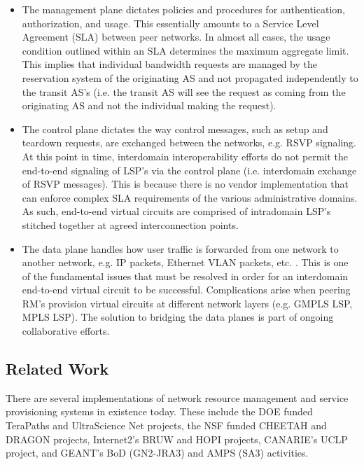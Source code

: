\documentclass[conference]{IEEEtran}
\begin{document}
\begin{itemize}
\item
The management plane dictates policies and procedures for authentication, 
authorization, and usage.  This essentially amounts to a Service Level 
Agreement (SLA) between peer networks.  In almost all cases, the 
usage 
condition outlined within an SLA determines the maximum aggregate limit.  
This implies that individual bandwidth requests are managed by the reservation 
system of the originating AS and not propagated independently to the transit 
AS's 
(i.e. the transit AS will see the request as coming from the originating AS and not the individual making the request).

\item
The control plane dictates the way control messages, such as setup and 
teardown requests, are exchanged between the networks, e.g. RSVP signaling.
At this point in time, interdomain interoperability efforts do not permit
the end-to-end signaling of LSP's via the control plane (i.e. interdomain 
exchange of RSVP messages).  This is because
there is no vendor implementation that can enforce complex SLA requirements of 
the various administrative domains.  As such, end-to-end virtual circuits are
comprised
of intradomain LSP's stitched together at agreed interconnection points.

\item
The data plane handles how user traffic is forwarded from one network to 
another network, e.g. IP packets, Ethernet VLAN packets, etc. \cite{vlan-ext}.
This is one of 
the fundamental issues that must be resolved in order for an interdomain 
end-to-end virtual circuit to be successful.  Complications arise when 
peering RM's provision virtual circuits at different network layers (e.g. 
GMPLS LSP, MPLS LSP).  The solution to bridging the data planes is part of 
ongoing collaborative efforts.
\end{itemize}


\subsection{Related Work}

There are several implementations of network resource management and
service provisioning systems in existence today.  These include the DOE funded
TeraPaths \cite{TeraPaths} and UltraScience Net \cite{USN} projects, the NSF funded CHEETAH \cite{CHEETAH} and
DRAGON \cite{DRAGON} projects,
Internet2's BRUW \cite{BRUW} and HOPI \cite{HOPI} projects, CANARIE's UCLP \cite{UCLP} 
project, and GEANT's
BoD (GN2-JRA3) \cite{GEANT} and AMPS (SA3) \cite{GEANT-AMPS} activities.
\end{document}
